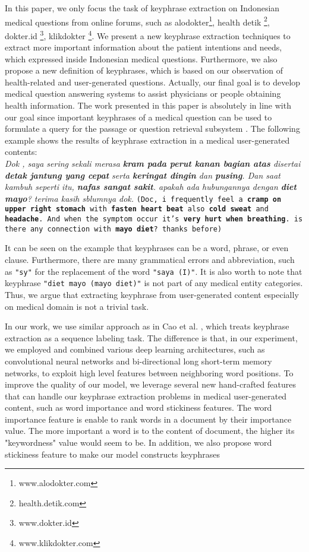 \documentclass[sigconf]{acmart}
\begin{document}
	In this paper, we only focus the task of keyphrase extraction on Indonesian medical questions from online forums, such as alodokter\footnote{www.alodokter.com}, health detik \footnote{health.detik.com}, dokter.id \footnote{www.dokter.id}, klikdokter \footnote{www.klikdokter.com}. We present a new keyphrase extraction techniques to extract more important information about the patient intentions and needs, which expressed inside Indonesian medical questions. Furthermore, we also propose a new definition of keyphrases, which is based on our observation of health-related and user-generated questions. Actually, our final goal is to develop medical question answering systems to assist physicians or people obtaining health information. The work presented in this paper is absolutely in line with our goal since important keyphrases of a medical question can be used to formulate a query for the passage or question retrieval subsystem \cite{gong2009improving}. The following example shows the results of keyphrase extraction in a medical user-generated contents:
	\textit{\\Dok , saya sering sekali merasa \textbf{\emph{kram pada perut kanan bagian atas}} disertai \textbf{detak jantung yang cepat} serta \textbf{keringat dingin} dan \textbf{pusing}. Dan saat kambuh seperti itu, \textbf{nafas sangat sakit}. apakah ada hubungannya dengan \textbf{diet mayo}? terima kasih sblumnya dok.}
	\texttt{(Doc, i frequently feel a \textbf{cramp on upper right stomach} with \textbf{fasten heart beat} also \textbf{cold sweat} and \textbf{headache}. And when the symptom occur it's \textbf{very hurt when breathing}. is there any connection with \textbf{mayo diet}? thanks before)}
	
	It can be seen on the example that keyphrases can be a word, phrase, or even clause. Furthermore, there are many grammatical errors and abbreviation, such as \texttt{"sy"} for the replacement of the word \texttt{"saya (I)"}. It is also worth to note that keyphrase \texttt{"diet mayo (mayo diet)"} is not part of any medical entity categories. Thus, we argue that extracting keyphrase from user-generated content especially on medical domain is not a trivial task. 
	
	In our work, we use similar approach as in Cao et al. \cite{cao2010automatically}, which treats keyphrase extraction as a sequence labeling task. The difference is that, in our experiment, we employed and combined various deep learning architectures, such as convolutional neural networks and bi-directional long short-term memory networks, to exploit high level features between neighboring word positions. To improve the quality of our model, we leverage several new hand-crafted features that can handle our keyphrase extraction problems in medical user-generated content, such as word importance and word stickiness features. The word importance feature is enable to rank words in a document by their importance value. The more important a word is to the content of document, the higher its "keywordness" value would seem to be. In addition, we also propose word stickiness feature to make our model constructs keyphrases
	
\end{document}
